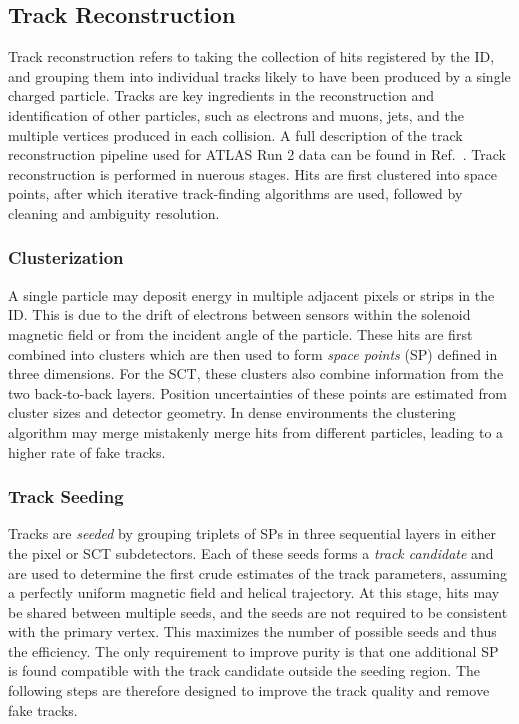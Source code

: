 \subsection{Track Reconstruction}

Track reconstruction refers to taking the collection of hits registered by the ID, and grouping them into individual tracks likely to have been produced by a single charged particle.
Tracks are key ingredients in the reconstruction and identification of other particles, such as electrons and muons, jets, and the multiple vertices produced in each collision.
A full description of the track reconstruction pipeline used for ATLAS Run 2 data can be found in Ref.~\cite{PerformanceATLASTrack}.
Track reconstruction is performed in nuerous stages.
Hits are first clustered into space points, after which iterative track-finding algorithms are used, followed by cleaning and ambiguity resolution.

\subsubsection{Clusterization}

A single particle may deposit energy in multiple adjacent pixels or strips in the ID\@.
This is due to the drift of electrons between sensors within the solenoid magnetic field or from the incident angle of the particle.
These hits are first combined into clusters which are then used to form \textit{space points} (SP) defined in three dimensions.
For the SCT, these clusters also combine information from the two back-to-back layers.
Position uncertainties of these points are estimated from cluster sizes and detector geometry.
In dense environments the clustering algorithm may merge mistakenly merge hits from different particles, leading to a higher rate of fake tracks.

\subsubsection{Track Seeding}

Tracks are \textit{seeded} by grouping triplets of SPs in three sequential layers in either the pixel or SCT subdetectors.
Each of these seeds forms a \textit{track candidate} and are used to determine the first crude estimates of the track parameters, assuming a perfectly uniform magnetic field and helical trajectory.
At this stage, hits may be shared between multiple seeds, and the seeds are not required to be consistent with the primary vertex.
This maximizes the number of possible seeds and thus the efficiency.
The only requirement to improve purity is that one additional SP is found compatible with the track candidate outside the seeding region.
The following steps are therefore designed to improve the track quality and remove fake tracks.

